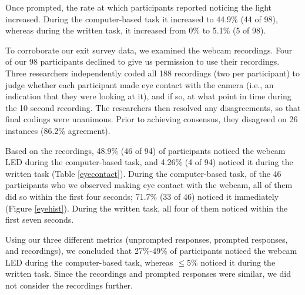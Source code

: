 \documentclass{sigchi}
\begin{document}
Once prompted, the rate at which participants reported noticing the light increased. During the computer-based task it increased to 44.9\% (44 of 98), whereas during the written task, it increased from 0\% to 5.1\% (5 of 98).


To corroborate our exit survey data, we examined the webcam recordings. Four of our 98 participants declined to give us permission to use their recordings. Three researchers independently coded all 188 recordings (two per participant) to judge whether each participant made eye contact with the camera (i.e., an indication that they were looking at it), and if so, at what point in time during the 10 second recording. The researchers then resolved any disagreements, so that final codings were unanimous. Prior to achieving consensus, they disagreed on 26 instances (86.2\% agreement).

Based on the recordings, 48.9\% (46 of 94) of participants noticed the webcam LED during the computer-based task, and 4.26\% (4 of 94) noticed it during the written task (Table \ref{eyecontact}). During the computer-based task, of the 46 participants who we observed making eye contact with the webcam, all of them did so within the first four seconds; 71.7\% (33 of 46) noticed it immediately (Figure \ref{eyehist}). During the written task, all four of them noticed within the first seven seconds.

Using our three different metrics (unprompted responses, prompted responses, and recordings), we concluded that 27\%-49\% of participants noticed the webcam LED during the computer-based task, whereas $\leq5\%$ noticed it during the written task. Since the recordings and prompted responses were similar, we did not consider the recordings further.

\end{document}
